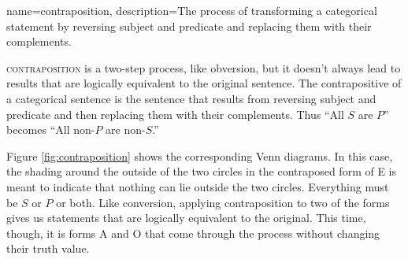 {
name=contraposition,
description={The process of transforming a categorical statement by reversing subject and predicate and replacing them with their complements.}
}


\textsc{\gls{contraposition}} is a two-step process, like obversion, but it doesn't always lead to results that are logically equivalent to the original sentence. The contrapositive of a categorical sentence is the sentence that results from reversing subject and predicate and then replacing them with their complements. Thus ``All $S$ are $P$'' becomes ``All non-$P$ are non-$S$.''

Figure \ref{fig:contraposition} shows the corresponding Venn diagrams. In this case, the shading around the outside of the two circles in the contraposed form of E is meant to indicate that nothing can lie outside the two circles. Everything must be $S$ or $P$ or both. Like conversion, applying contraposition to two of the forms gives us statements that are logically equivalent to the original. This time, though, it is forms A and O that come through the process without changing their truth value.

